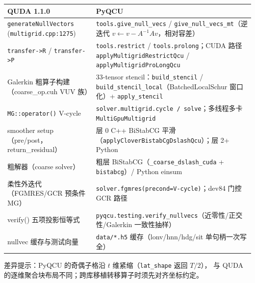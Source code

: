 \documentclass[UTF8]{ctexart}
\begin{document}
\begin{center}
\begin{tabular}{p{}p{}}
\hline
\textbf{QUDA 1.1.0} & \textbf{PyQCU} \\
\hline
\texttt{generateNullVectors} (\textcolor{evidence}{\texttt{\nolinkurl{multigrid.cpp:1275}}}) & \texttt{tools.give\_null\_vecs} / \texttt{give\_null\_vecs\_mt}（逆迭代 $v \leftarrow v - A^{-1}Av$，相对容差） \\
\texttt{transfer->R} / \texttt{transfer->P} & \texttt{tools.restrict} / \texttt{tools.prolong}；CUDA 路径 \texttt{applyMultigridRestrictQcu} / \texttt{applyMultigridProLongQcu} \\
Galerkin 粗算子构建（coarse\_op.cuh VUV 族） & 33-tensor stencil：\texttt{build\_stencil} / \texttt{build\_stencil\_local}（BatchedLocalSchur 窗口化）+ \texttt{apply\_stencil} \\
\texttt{MG::operator()} V-cycle & \texttt{solver.multigrid.cycle / solve}；多线程多卡 \texttt{MultiGpuMultigrid} \\
smoother setup（pre/post，return\_residual） & 层 0 C++ BiStabCG 平滑（\texttt{applyCloverBistabCgDslashQcu}）；层 2+ Python \\
粗解器（coarse solver） & 粗层 BiStabCG（\texttt{\_coarse\_dslash\_cuda} + \texttt{bistabcg}）/ Python einsum \\
柔性外迭代（FGMRES/GCR 预条件 MG） & \texttt{solver.fgmres(precond=V-cycle)}；dev84 门控 GCR 路径 \\
verify() 五项投影恒等式 & \texttt{pyqcu.testing.verify\_nullvecs}（近零性/正交性/Galerkin 一致性抽样） \\
nullvec 缓存与测试向量 & \texttt{data/*.h5} 缓存（lonv/hnn/hdg/sit 单句柄一次写全） \\
\hline
\end{tabular}
\end{center}

\noindent\textcolor{reference}{差异提示：PyQCU 的奇偶子格沿 $t$ 维紧缩（\texttt{lat\_shape} 返回 $T/2$），
与 QUDA 的逐维聚合块布局不同；跨库移植转移算子时须先对齐坐标约定。}
\end{document}
